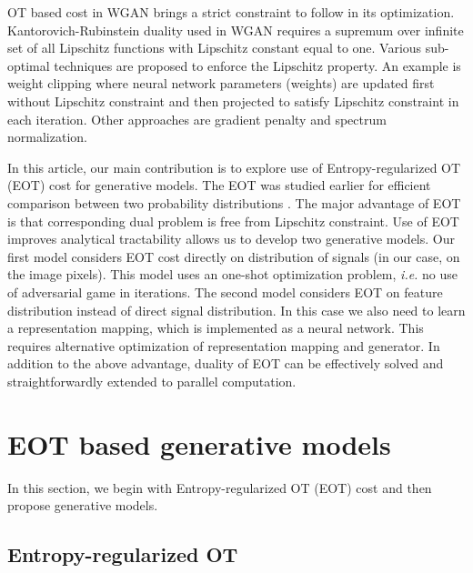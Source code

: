 OT based cost in WGAN brings a strict constraint to follow in its optimization.
Kantorovich-Rubinstein duality used in WGAN requires a supremum over
infinite set of all Lipschitz functions with Lipschitz constant equal
to one. Various sub-optimal techniques are proposed to enforce the
Lipschitz property. An example is weight clipping
\cite{2017arXiv170107875A} where neural network parameters (weights)
are updated first without Lipschitz constraint and then projected to
satisfy Lipschitz constraint in each iteration. Other approaches are
gradient penalty\cite{2017arXiv170400028G} and spectrum normalization\cite{2018arXiv180205957M}.

In this article, our main contribution is to explore use of Entropy-regularized OT (EOT) cost for generative models. 
The EOT was studied earlier for efficient comparison between two probability distributions \cite{2013arXiv1306.0895C}. 
The major advantage of EOT is
that corresponding dual problem is free from Lipschitz constraint. Use of EOT improves
analytical tractability allows us to develop two generative models. Our
first model considers EOT cost directly on distribution of signals (in our case,
on the image pixels). This model uses an one-shot optimization problem, \emph{i.e.} no use of adversarial game in iterations. The second model
considers EOT on feature distribution instead of direct signal
distribution. In this case we also need to learn a representation
mapping, which is implemented as a neural network. 
This requires alternative optimization of representation mapping and
generator. In addition to the above advantage, duality of EOT can be
effectively solved and straightforwardly extended to parallel computation. 


\section{EOT based generative models}

In this section, we begin with Entropy-regularized OT (EOT) cost and then propose generative models.

\subsection{Entropy-regularized OT} 

